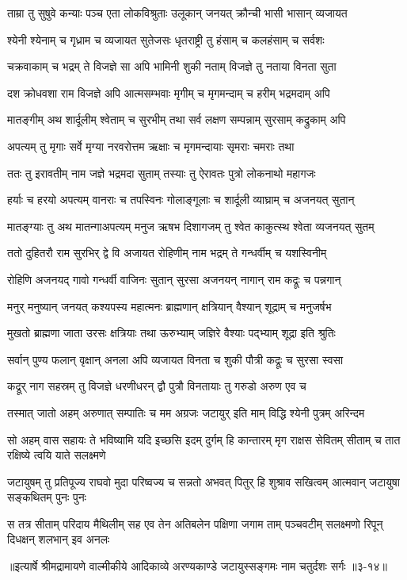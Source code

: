\twolineshloka
{ताम्रा तु सुषुवे कन्याः पञ्च एता लोकविश्रुताः}
{उलूकान् जनयत् क्रौन्ची भासी भासान् व्यजायत} %

\twolineshloka
{श्येनी श्येनाम् च गृध्राम च व्यजायत सुतेजसः}
{धृतराष्ट्री तु हंसाम् च कलहंसाम् च सर्वशः} %

\twolineshloka
{चक्रवाकाम् च भद्रम् ते विजज्ञे सा अपि भामिनी}
{शुकी नताम् विजज्ञे तु नताया विनता सुता} %

\twolineshloka
{दश क्रोधवशा राम विजज्ञे अपि आत्मसम्भवाः}
{मृगीम् च मृगमन्दाम् च हरीम् भद्रमदाम् अपि} %

\twolineshloka
{मातङ्गीम् अथ शार्दूलीम् श्वेताम् च सुरभीम् तथा}
{सर्व लक्षण सम्पन्नाम् सुरसाम् कद्रुकाम् अपि} %

\twolineshloka
{अपत्यम् तु मृगाः सर्वे मृग्या नरवरोत्तम}
{ऋक्षाः च मृगमन्दायाः सृमराः चमराः तथा} %

\twolineshloka
{ततः तु इरावतीम् नाम जज्ञे भद्रमदा सुताम्}
{तस्याः तु ऐरावतः पुत्रो लोकनाथो महागजः} %

\twolineshloka
{हर्याः च हरयो अपत्यम् वानराः च तपस्विनः}
{गोलाङ्गूलाः च शार्दूली व्याघ्राम् च अजनयत् सुतान्} %

\twolineshloka
{मातङ्ग्याः तु अथ मातन्गाअपत्यम् मनुज ऋषभ}
{दिशागजम् तु श्वेत काकुत्स्थ श्वेता व्यजनयत् सुतम्} %

\twolineshloka
{ततो दुहितरौ राम सुरभिर् द्वे वि अजायत}
{रोहिणीम् नाम भद्रम् ते गन्धर्वीम् च यशस्विनीम्} %

\twolineshloka
{रोहिणि अजनयद् गावो गन्धर्वी वाजिनः सुतान्}
{सुरसा अजनयन् नागान् राम कद्रूः च पन्नगान्} %

\twolineshloka
{मनुर् मनुष्यान् जनयत् कश्यपस्य महात्मनः}
{ब्राह्मणान् क्षत्रियान् वैश्यान् शूद्राम् च मनुजर्षभ} %

\twolineshloka
{मुखतो ब्राह्मणा जाता उरसः क्षत्रियाः तथा}
{ऊरुभ्याम् जज्ञिरे वैश्याः पद्भ्याम् शूद्रा इति श्रुतिः} %

\twolineshloka
{सर्वान् पुण्य फलान् वृक्षान् अनला अपि व्यजायत}
{विनता च शुकी पौत्री कद्रूः च सुरसा स्वसा} %

\twolineshloka
{कद्रूर् नाग सहस्रम् तु विजज्ञे धरणीधरन्}
{द्वौ पुत्रौ विनतायाः तु गरुडो अरुण एव च} %

\twolineshloka
{तस्मात् जातो अहम् अरुणात् सम्पातिः च मम अग्रजः}
{जटायुर् इति माम् विद्धि श्येनी पुत्रम् अरिन्दम} %

\twolineshloka
{सो अहम् वास सहायः ते भविष्यामि यदि इच्छसि}
{इदम् दुर्गम् हि कान्तारम् मृग राक्षस सेवितम् सीताम् च तात रक्षिष्ये त्वयि याते सलक्ष्मणे} %

\twolineshloka
{जटायुषम् तु प्रतिपूज्य राघवो मुदा परिष्वज्य च सन्नतो अभवत्}
{पितुर् हि शुश्राव सखित्वम् आत्मवान् जटायुषा सङ्कथितम् पुनः पुनः} %

\twolineshloka
{स तत्र सीताम् परिदाय मैथिलीम् सह एव तेन अतिबलेन पक्षिणा}
{जगाम ताम् पञ्चवटीम् सलक्ष्मणो रिपून् दिधक्षन् शलभान् इव अनलः} %


॥इत्यार्षे श्रीमद्रामायणे वाल्मीकीये आदिकाव्ये अरण्यकाण्डे जटायुस्सङ्गमः नाम चतुर्दशः सर्गः ॥३-१४॥
